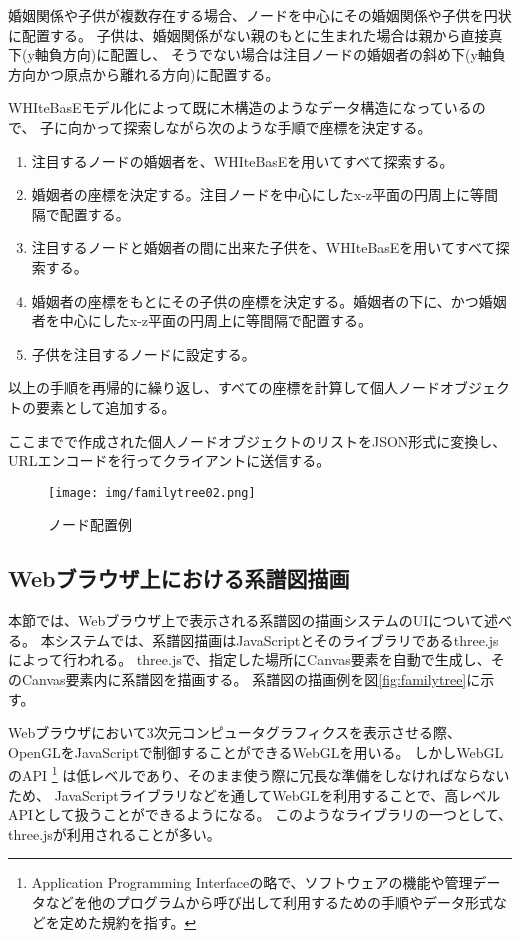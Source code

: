 婚姻関係や子供が複数存在する場合、ノードを中心にその婚姻関係や子供を円状に配置する。
子供は、婚姻関係がない親のもとに生まれた場合は親から直接真下(y軸負方向)に配置し、
そうでない場合は注目ノードの婚姻者の斜め下(y軸負方向かつ原点から離れる方向)に配置する。

WHIteBasEモデル化によって既に木構造のようなデータ構造になっているので、
子に向かって探索しながら次のような手順で座標を決定する。
\begin{enumerate}
    \item 注目するノードの婚姻者を、WHIteBasEを用いてすべて探索する。
    \item 婚姻者の座標を決定する。注目ノードを中心にしたx-z平面の円周上に等間隔で配置する。
    \item 注目するノードと婚姻者の間に出来た子供を、WHIteBasEを用いてすべて探索する。
    \item 婚姻者の座標をもとにその子供の座標を決定する。婚姻者の下に、かつ婚姻者を中心にしたx-z平面の円周上に等間隔で配置する。
    \item 子供を注目するノードに設定する。
\end{enumerate}
以上の手順を再帰的に繰り返し、すべての座標を計算して個人ノードオブジェクトの要素として追加する。

ここまでで作成された個人ノードオブジェクトのリストをJSON形式に変換し、
URLエンコードを行ってクライアントに送信する。

\begin{figure}[htbp]
    \begin{center}
        \texttt{[image: img/familytree02.png]}
        \caption{ノード配置例}
        \label{fig:node}
    \end{center}
\end{figure}

\subsection{Webブラウザ上における系譜図描画}\label{tag:client}
本節では、Webブラウザ上で表示される系譜図の描画システムのUIについて述べる。
本システムでは、系譜図描画はJavaScriptとそのライブラリであるthree.js\cite{threejs}によって行われる。
three.jsで、指定した場所にCanvas要素を自動で生成し、そのCanvas要素内に系譜図を描画する。
系譜図の描画例を図\ref{fig:familytree}に示す。

Webブラウザにおいて3次元コンピュータグラフィクスを表示させる際、
OpenGL\cite{opengl}をJavaScript\cite{javascript}で制御することができるWebGL\cite{webgl}を用いる。
しかしWebGLのAPI
\footnote{Application Programming Interfaceの略で、ソフトウェアの機能や管理データなどを他のプログラムから呼び出して利用するための手順やデータ形式などを定めた規約を指す。}
は低レベルであり、そのまま使う際に冗長な準備をしなければならないため、
JavaScriptライブラリなどを通してWebGLを利用することで、高レベルAPIとして扱うことができるようになる。
このようなライブラリの一つとして、three.jsが利用されることが多い。


